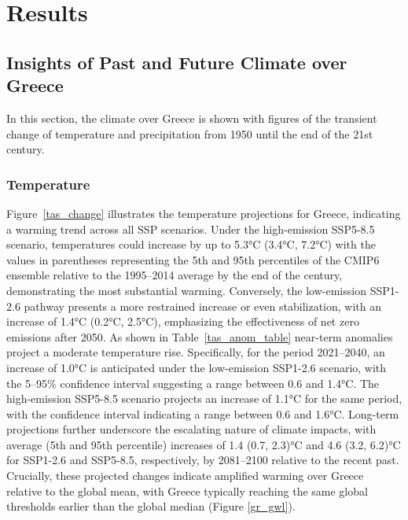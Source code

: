 \documentclass[pdflatex,sn-chicago]{sn-jnl}%
\theoremstyle{thmstyleone}%
\theoremstyle{thmstyletwo}%
\theoremstyle{thmstylethree}%
\begin{document}
\section{Results}\label{sec3}

\subsection{Insights of Past and Future Climate over Greece}
In this section, the climate over Greece is shown with figures of the transient change of temperature and precipitation from 1950 until the end of the 21st century.


\subsubsection{Temperature}
Figure~\ref{tas_change} illustrates the temperature projections for Greece, indicating a warming trend across all SSP scenarios. Under the high-emission SSP5-8.5 scenario, temperatures could increase by up to 5.3°C (3.4°C, 7.2°C) with the values in parentheses representing the 5th and 95th percentiles of the CMIP6 ensemble relative to the 1995--2014 average by the end of the century, demonstrating the most substantial warming. Conversely, the low-emission SSP1-2.6 pathway presents a more restrained increase or even stabilization, with an increase of 1.4°C (0.2°C, 2.5°C), emphasizing the effectiveness of net zero emissions after 2050. As shown in Table~\ref{tas_anom_table} near-term anomalies project a moderate temperature rise. Specifically, for the period 2021--2040, an increase of 1.0°C is anticipated under the low-emission SSP1-2.6 scenario, with the 5--95\% confidence interval suggesting a range between 0.6 and 1.4°C. The high-emission SSP5-8.5 scenario projects an increase of 1.1°C for the same period, with the confidence interval indicating a range between 0.6 and 1.6°C. Long-term projections further underscore the escalating nature of climate impacts, with average (5th and 95th percentile) increases of 1.4 (0.7, 2.3)°C and 4.6 (3.2, 6.2)°C for SSP1-2.6 and SSP5-8.5, respectively, by 2081--2100 relative to the recent past. Crucially, these projected changes indicate amplified warming over Greece relative to the global mean, with Greece typically reaching the same global thresholds earlier than the global median (Figure \ref{gr_gwl}).
\end{document}
